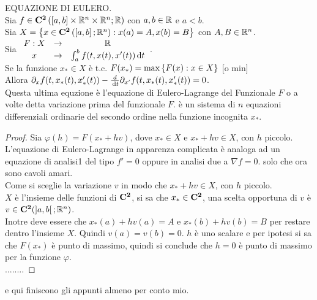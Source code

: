 \theorem EQUAZIONE DI EULERO.\\
Sia $f\in \mathbf{C^{2}}\left(\left[a,b\right]\times \mathbb{R} ^n\times \mathbb{R} ^n; \mathbb{R} \right)$ con $a,b\in \mathbb{R} $ e $a<b$.\\
Sia $X=\left\{x\in \mathbf{C^{2}}\left(\left[a,b\right]; \mathbb{R} ^n\right): x(a)=A, x(b)=B\right\}$ con $A,B\in \mathbb{R} ^n$.\\
Sia $\begin{array}{ccc} F: X & \to & \mathbb{R} \\
x & \to & \int_{a}^b f(t,x(t), x'(t))\,\mathrm{d}{t}\end{array}$.\\
Se la funzione $x_\ast\in X$ è t.c. $F(x_\ast)=\max\left\{F(x):x\in X \right\}$ [o min]\\
Allora $\partial_xf(t,x_\ast(t), x_\ast'(t))-\frac{d}{\,\mathrm{d}{t}}\partial_{ x'}f(t,x_\ast(t), x_\ast'(t))=0$.\\
Questa ultima equzione è l'equazione di Eulero-Lagrange del Funzionale $F$ o a volte detta variazione prima del funzionale $F$. è un sistema di $n$ equazioni differenziali ordinarie del secondo ordine nella funzione incognita $x_\ast$.
\begin{proof}
	 Sia $\varphi(h)=F(x_\ast+hv)$, dove $x_\ast\in X$ e $x_\ast+hv\in X$, con $h$ piccolo.\\
	 L'equazione di Eulero-Lagrange in apparenza complicata è analoga ad un equazione di analisi1 del tipo $f'=0$ oppure in analisi due a $\nabla f=0$. solo che ora sono cavoli amari.\\
	 Come si sceglie la variazione $v$ in modo che $x_\ast+hv\in X$, con $h$ piccolo.\\
	 $X$ è l'insieme delle funzioni di $\mathbf{C^{2}}$, si sa che $x_\ast\in \mathbf{C^{2}}$, una scelta opportuna di $v$ è $v\in \mathbf{C^{2}}(\left]a,b\right[; \mathbb{R} ^n)$.\\
	 Inotre deve essere che $ x_\ast(a)+hv(a)=A$ e  $x_\ast(b)+hv(b)=B$ per restare dentro l'insieme $X$.
	 Quindi $v(a)=v(b)=0$.
	 $h$ è uno scalare e per ipotesi si sa che $F(x_\ast)$ è punto di massimo, quindi si conclude che $h=0$ è punto di massimo per la funzione $\varphi$.\\
	 ........ 
\end{proof}
e qui finiscono gli appunti almeno per conto mio.



